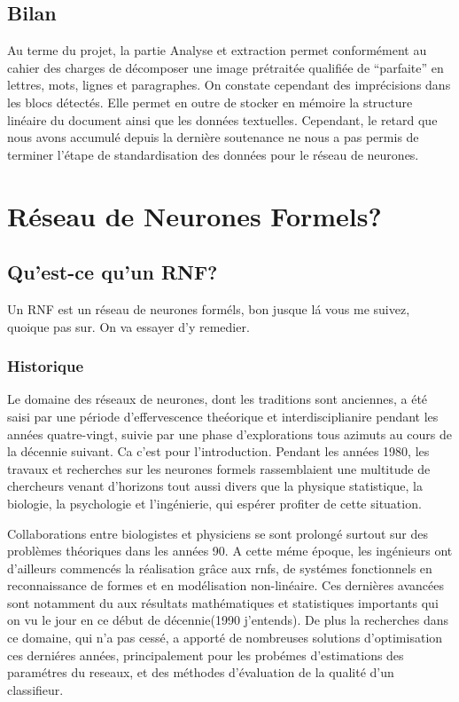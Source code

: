 \documentclass[a4paper,12pt]{report}
\begin{document}
\section{Bilan}

Au terme du projet, la partie Analyse et extraction permet conformément au cahier des
charges de décomposer une image prétraitée qualifiée de ``parfaite'' en lettres, mots, lignes
et paragraphes. On constate cependant des imprécisions dans les blocs détectés. Elle
permet en outre de stocker en mémoire la structure linéaire du document ainsi que les
données textuelles. Cependant, le retard que nous avons accumulé depuis la dernière
soutenance ne nous a pas permis de terminer l'étape de standardisation des données pour
le réseau de neurones.








\chapter{ R\'eseau de Neurones Formels?}

\section{ Qu'est-ce qu'un RNF?}
Un RNF est un r\'eseau de neurones form\'els, bon jusque l\'a vous me
suivez, quoique pas sur. On va essayer d'y remedier.
\subsection{Historique}
Le domaine des r\'eseaux de neurones, dont les traditions sont
anciennes, a \'et\'e saisi par une p\'eriode d'effervescence
the\'eorique et interdisciplianire pendant les ann\'ees quatre-vingt,
suivie par une phase d'explorations tous azimuts au cours de la
d\'ecennie suivant. Ca c'est pour l'introduction.
Pendant les ann\'ees 1980, les travaux et recherches sur les neurones
formels rassemblaient une multitude de chercheurs venant d'horizons
tout aussi divers que la physique statistique, la biologie,
la psychologie et l'ing\'enierie, qui esp\'erer profiter de cette
situation.

Collaborations entre biologistes et physiciens se sont prolong\'e
surtout sur des probl\`emes th\'eoriques dans les ann\'ees 90. A cette
m\'eme \'epoque, les ing\'enieurs ont d'ailleurs commenc\'es la
r\'ealisation gr\^ace aux rnfs, de syst\'emes fonctionnels en
reconnaissance de formes et en mod\'elisation non-lin\'eaire.
Ces derni\`eres avanc\'ees sont notamment du aux r\'esultats
math\'ematiques et statistiques importants qui on vu le jour en ce
d\'ebut de d\'ecennie(1990 j'entends). De plus la
recherches dans ce domaine, qui n'a pas cess\'e, a apport\'e de nombreuses solutions
d'optimisation ces derni\'eres ann\'ees, principalement pour les
prob\'emes d'estimations des param\'etres du reseaux, et des
m\'ethodes d'\'evaluation de la qualit\'e d'un classifieur.
\end{document}
